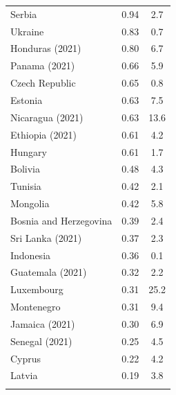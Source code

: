 \begin{longtable}{lcc}
	Serbia                    & 0.94                          & 2.7                               \\
	Ukraine                   & 0.83                          & 0.7                               \\
	Honduras (2021)           & 0.80                          & 6.7                               \\
	Panama (2021)             & 0.66                          & 5.9                               \\
	Czech Republic            & 0.65                          & 0.8                               \\
	Estonia                   & 0.63                          & 7.5                               \\
	Nicaragua (2021)          & 0.63                          & 13.6                              \\
	Ethiopia (2021)           & 0.61                          & 4.2                               \\
	Hungary                   & 0.61                          & 1.7                               \\
	Bolivia                   & 0.48                          & 4.3                               \\
	Tunisia                   & 0.42                          & 2.1                               \\
	Mongolia                  & 0.42                          & 5.8                               \\
	Bosnia and Herzegovina    & 0.39                          & 2.4                               \\
	Sri Lanka (2021)          & 0.37                          & 2.3                               \\
	Indonesia                 & 0.36                          & 0.1                               \\
	Guatemala (2021)          & 0.32                          & 2.2                               \\
	Luxembourg                & 0.31                          & 25.2                              \\
	Montenegro                & 0.31                          & 9.4                               \\
	Jamaica (2021)            & 0.30                          & 6.9                               \\
	Senegal (2021)            & 0.25                          & 4.5                               \\
	Cyprus                    & 0.22                          & 4.2                               \\
	Latvia                    & 0.19                          & 3.8                               \\
	\bottomrule
	\label{tab:Beispieltab-5_EN}
\end{longtable}


